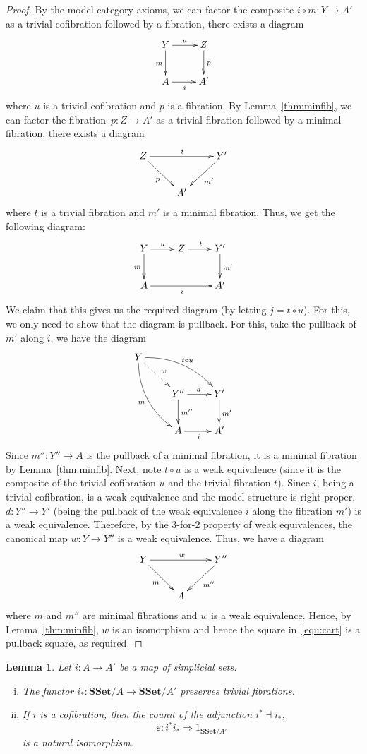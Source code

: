 \documentclass[reqno,10pt,a4paper,oneside]{amsart}
\newcommand{\xycenter}[1]{\vcenter{\hbox{\xymatrix{#1}}}}
\newcommand{\ie}{\text{i.e.\ }}
\newtheorem{lemma}[theorem]{Lemma}
\theoremstyle{definition}
\newcommand{\co}{\colon}
\newcommand{\SSet}{\mathbf{SSet}}
\begin{document}
\begin{proof} By the model category axioms, we can factor the composite $i \circ m \co Y \to A'$ as
a trivial cofibration followed by a fibration, \ie there exists a diagram
\[
\xymatrix{
Y \ar[d]_{m} \ar[r]^{u}  & Z \ar[d]^{p} \\
A \ar[r]_{i} & A'}
\]
where $u$ is a trivial cofibration and $p$ is a fibration. By Lemma~\ref{thm:minfib}, we can factor the 
fibration~$p \co Z \to A'$
as a trivial fibration followed by a minimal fibration, \ie there exists a diagram
\[
\xymatrix{
Z \ar[rr]^t \ar[dr]_{p}  & &  Y' \ar[dl]^{m'} \\
  & A' & }
  \]
  where $t$ is a trivial fibration and $m'$ is a minimal fibration. Thus, we get the following diagram:
  \begin{equation}
  \label{equ:cart}
\xycenter{
Y \ar[r]^{u} \ar[d]_m & Z \ar[r]^{t} & Y' \ar[d]^{m'} \\
A \ar[rr]_{i} & & A'}
\end{equation}
We claim that this gives us the required diagram (by letting $j = t \circ u$). For this, we only need to
 show that the diagram is pullback. For this, take the pullback of $m'$ along $i$, we have the diagram
\[
\xymatrix{
Y \ar@/^1pc/[drr]^{t \circ u} \ar@/_1pc/[ddr]_m  \ar@{.>}[dr]^{w} &  & \\
 & Y'' \ar[r]^(.5){d} \ar[d]^-{m''}  & Y' \ar[d]^{m'}  \\
  & A \ar[r]_{i} & A'}
  \]
  Since $m'' \co Y'' \to A$ is the pullback of a minimal fibration, it is a minimal fibration by Lemma~\ref{thm:minfib}.   
 Next, note $t \circ u$ is a weak equivalence (since it is the composite of the trivial cofibration $u$ and the trivial fibration $t$). Since $i$, being a trivial cofibration, is a weak equivalence and the model structure is right proper, $d \co Y'' \to Y'$ (being the pullback of the weak equivalence $i$ along the fibration $m'$) is a weak equivalence. Therefore, by 
 the 3-for-2 property of weak equivalences, the canonical map $w \co Y \to Y''$ is a weak equivalence. Thus, we have a diagram
\[
\xymatrix{
Y \ar[rr]^{w} \ar[dr]_m & & Y'' \ar[dl]^{m''} \\
 & A & }
 \]
where $m$ and $m''$ are minimal fibrations and $w$ is a weak equivalence. Hence, by Lemma~\ref{thm:minfib}, $w$ is an
isomorphism and hence the square in~\eqref{equ:cart} is a pullback square, as required.
\end{proof}


\begin{lemma} \label{thm:trick} Let $i \co A \to A'$ be a map of simplicial sets.
\begin{enumerate}[(i)]
\item The functor $i_* \co \SSet/A \to \SSet/A'$ preserves trivial fibrations.
\item If $i$ is a cofibration, then the counit of the adjunction $i^* \dashv i_*$, 
\[
\varepsilon \co i^* i_* \Rightarrow 1_{\SSet/A'}
\]
is a natural isomorphism.
\end{enumerate}
\end{lemma}
\end{document}

